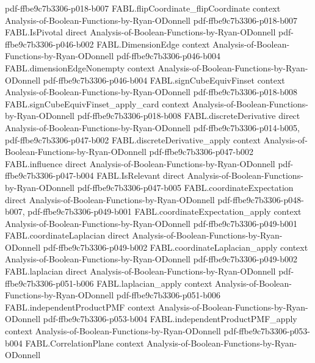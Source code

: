 \begin{theorem}
  {pdf-ffbe9c7b3306-p018-b007}
\proofstep
  {FABL.flipCoordinate_flipCoordinate}
  {context}
  {Analysis-of-Boolean-Functions-by-Ryan-ODonnell}
  {pdf-ffbe9c7b3306-p018-b007}
\proofstep
  {FABL.IsPivotal}
  {direct}
  {Analysis-of-Boolean-Functions-by-Ryan-ODonnell}
  {pdf-ffbe9c7b3306-p046-b002}
\proofstep
  {FABL.DimensionEdge}
  {context}
  {Analysis-of-Boolean-Functions-by-Ryan-ODonnell}
  {pdf-ffbe9c7b3306-p046-b004}
\proofstep
  {FABL.dimensionEdgeNonempty}
  {context}
  {Analysis-of-Boolean-Functions-by-Ryan-ODonnell}
  {pdf-ffbe9c7b3306-p046-b004}
\proofstep
  {FABL.signCubeEquivFinset}
  {context}
  {Analysis-of-Boolean-Functions-by-Ryan-ODonnell}
  {pdf-ffbe9c7b3306-p018-b008}
\proofstep
  {FABL.signCubeEquivFinset_apply_card}
  {context}
  {Analysis-of-Boolean-Functions-by-Ryan-ODonnell}
  {pdf-ffbe9c7b3306-p018-b008}
\proofstep
  {FABL.discreteDerivative}
  {direct}
  {Analysis-of-Boolean-Functions-by-Ryan-ODonnell}
  {pdf-ffbe9c7b3306-p014-b005,
    pdf-ffbe9c7b3306-p047-b002}
\proofstep
  {FABL.discreteDerivative_apply}
  {context}
  {Analysis-of-Boolean-Functions-by-Ryan-ODonnell}
  {pdf-ffbe9c7b3306-p047-b002}
\proofstep
  {FABL.influence}
  {direct}
  {Analysis-of-Boolean-Functions-by-Ryan-ODonnell}
  {pdf-ffbe9c7b3306-p047-b004}
\proofstep
  {FABL.IsRelevant}
  {direct}
  {Analysis-of-Boolean-Functions-by-Ryan-ODonnell}
  {pdf-ffbe9c7b3306-p047-b005}
\proofstep
  {FABL.coordinateExpectation}
  {direct}
  {Analysis-of-Boolean-Functions-by-Ryan-ODonnell}
  {pdf-ffbe9c7b3306-p048-b007,
    pdf-ffbe9c7b3306-p049-b001}
\proofstep
  {FABL.coordinateExpectation_apply}
  {context}
  {Analysis-of-Boolean-Functions-by-Ryan-ODonnell}
  {pdf-ffbe9c7b3306-p049-b001}
\proofstep
  {FABL.coordinateLaplacian}
  {direct}
  {Analysis-of-Boolean-Functions-by-Ryan-ODonnell}
  {pdf-ffbe9c7b3306-p049-b002}
\proofstep
  {FABL.coordinateLaplacian_apply}
  {context}
  {Analysis-of-Boolean-Functions-by-Ryan-ODonnell}
  {pdf-ffbe9c7b3306-p049-b002}
\proofstep
  {FABL.laplacian}
  {direct}
  {Analysis-of-Boolean-Functions-by-Ryan-ODonnell}
  {pdf-ffbe9c7b3306-p051-b006}
\proofstep
  {FABL.laplacian_apply}
  {context}
  {Analysis-of-Boolean-Functions-by-Ryan-ODonnell}
  {pdf-ffbe9c7b3306-p051-b006}
\proofstep
  {FABL.independentProductPMF}
  {context}
  {Analysis-of-Boolean-Functions-by-Ryan-ODonnell}
  {pdf-ffbe9c7b3306-p053-b004}
\proofstep
  {FABL.independentProductPMF_apply}
  {context}
  {Analysis-of-Boolean-Functions-by-Ryan-ODonnell}
  {pdf-ffbe9c7b3306-p053-b004}
\proofstep
  {FABL.CorrelationPlane}
  {context}
  {Analysis-of-Boolean-Functions-by-Ryan-ODonnell}

\end{theorem}
